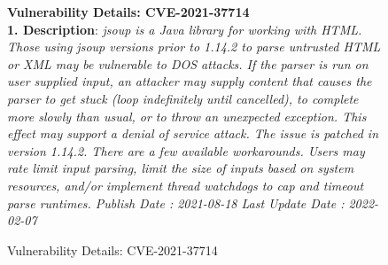 \begin{figure}[t]
  \begin{flushleft}
    \footnotesize
\textbf{Vulnerability Details: CVE-2021-37714}\\
\textbf{1. Description}:
{\em jsoup is a Java library for working with HTML. Those using jsoup versions prior to 1.14.2 to parse untrusted HTML or XML may be vulnerable to DOS attacks. If the parser is run on user supplied input, an attacker may supply content that causes the parser to get stuck (loop indefinitely until cancelled), to complete more slowly than usual, or to throw an unexpected exception. This effect may support a denial of service attack. The issue is patched in version 1.14.2. There are a few available workarounds. Users may rate limit input parsing, limit the size of inputs based on system resources, and/or implement thread watchdogs to cap and timeout parse runtimes.
  Publish Date : 2021-08-18 Last Update Date : 2022-02-07}
\end{flushleft}
  \vspace{-16pt}
\caption{Vulnerability Details: CVE-2021-37714}
\label{CVSS-tab}
\end{figure}

